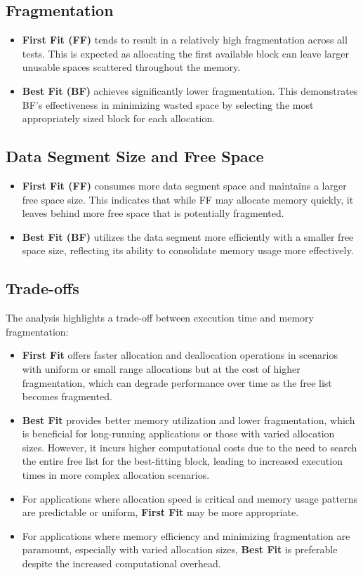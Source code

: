 \documentclass[12pt]{article}
\begin{document}
\subsection{Fragmentation}
\begin{itemize}
    \item \textbf{First Fit (FF)} tends to result in a relatively high fragmentation across all tests. This is expected as allocating the first available block can leave larger unusable spaces scattered throughout the memory.
    \item \textbf{Best Fit (BF)} achieves significantly lower fragmentation. This demonstrates BF's effectiveness in minimizing wasted space by selecting the most appropriately sized block for each allocation.
\end{itemize}

\subsection{Data Segment Size and Free Space}
\begin{itemize}
    \item \textbf{First Fit (FF)} consumes more data segment space and maintains a larger free space size. This indicates that while FF may allocate memory quickly, it leaves behind more free space that is potentially fragmented.
    \item \textbf{Best Fit (BF)} utilizes the data segment more efficiently with a smaller free space size, reflecting its ability to consolidate memory usage more effectively.
\end{itemize}

\subsection{Trade-offs}
The analysis highlights a trade-off between execution time and memory fragmentation:
\begin{itemize}
    \item \textbf{First Fit} offers faster allocation and deallocation operations in scenarios with uniform or small range allocations but at the cost of higher fragmentation, which can degrade performance over time as the free list becomes fragmented.
    \item \textbf{Best Fit} provides better memory utilization and lower fragmentation, which is beneficial for long-running applications or those with varied allocation sizes. However, it incurs higher computational costs due to the need to search the entire free list for the best-fitting block, leading to increased execution times in more complex allocation scenarios.
    \item For applications where allocation speed is critical and memory usage patterns are predictable or uniform, \textbf{First Fit} may be more appropriate.
    \item For applications where memory efficiency and minimizing fragmentation are paramount, especially with varied allocation sizes, \textbf{Best Fit} is preferable despite the increased computational overhead.
\end{itemize}
\end{document}
